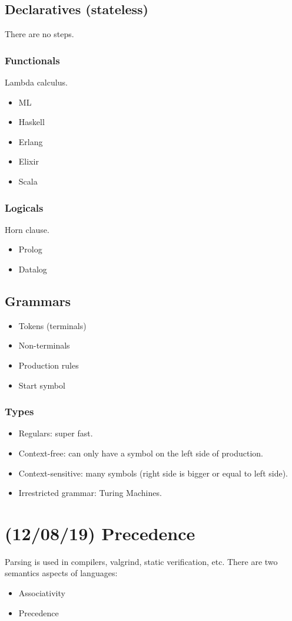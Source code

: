 \documentclass[11pt]{article}
\begin{document}
\subsection{Declaratives (stateless)}
\label{sec:org53109c0}
There are no steps.
\subsubsection{Functionals}
\label{sec:orgd6b3012}
Lambda calculus.
\begin{itemize}
\item ML
\item Haskell
\item Erlang
\item Elixir
\item Scala
\end{itemize}
\subsubsection{Logicals}
\label{sec:orga753895}
Horn clause.
\begin{itemize}
\item Prolog
\item Datalog
\end{itemize}
\subsection{Grammars}
\label{sec:org4515c43}
\begin{itemize}
\item Tokens (terminals)
\item Non-terminals
\item Production rules
\item Start symbol
\end{itemize}
\subsubsection{Types}
\label{sec:orgc822473}
\begin{itemize}
\item Regulars: super fast.
\item Context-free: can only have a symbol on the left side of production.
\item Context-sensitive: many symbols (right side is bigger or equal to left side).
\item Irrestricted grammar: Turing Machines.
\end{itemize}
\section{(12/08/19) Precedence}
\label{sec:org7b9ac8d}
Parsing is used in compilers, valgrind, static verification, etc.
There are two semantics aspects of languages:
\begin{itemize}
\item Associativity
\item Precedence
\end{itemize}
\end{document}
